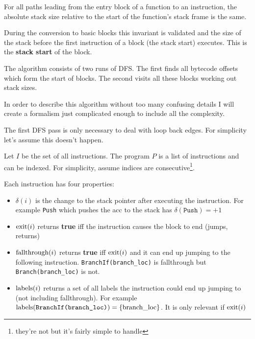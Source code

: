 For all paths leading from the entry block of a function to an instruction, the absolute stack size
relative to the start of the function's stack frame is the same.

During the conversion to basic blocks this invariant is validated and the size of the stack before
the first instruction of a block (the stack start) executes. This is the \textbf{stack start} of
the block.


The algorithm consists of two runs of DFS. The first finds all bytecode offsets which form the
start of blocks. The second visits all these blocks working out stack sizes.

In order to describe this algorithm without too many confusing details I will create a formalism
just complicated enough to include all the complexity.

The first DFS pass is only necessary to deal with loop back edges. For simplicity let's assume this
doesn't happen.

Let \(I\) be the set of all instructions. The program \(P\) is a list of instructions and can be
indexed. For simplicity, assume indices are consecutive\footnote{they're not but it's fairly simple
      to handle}.

Each instruction has four properties:

\begin{itemize}
      \item \(\delta(i)\) is the change to the stack pointer after executing the instruction. For
            example \texttt{Push} which pushes the acc to the stack has \(\delta(\texttt{Push}) =
            +1\)
      \item \(\operatorname{exit}(i)\) returns \textbf{true} iff the instruction causes the block to end
            (jumps, returns)
      \item \(\operatorname{fallthrough}(i)\) returns \textbf{true} iff \(\operatorname{exit}(i)\) and it can end up
            jumping to the following instruction. \texttt{BranchIf(branch\_loc)} is fallthrough but
            \texttt{Branch(branch\_loc)} is not.
      \item \(\operatorname{labels}(i)\) returns a set of all labels the instruction could end up jumping to
            (not
            including fallthrough). For example \(\operatorname{labels}(\texttt{BranchIf(branch\_loc)}) =
            \{\text{branch\_loc}\}\). It is only relevant if \(\operatorname{exit}(i)\)
\end{itemize}

